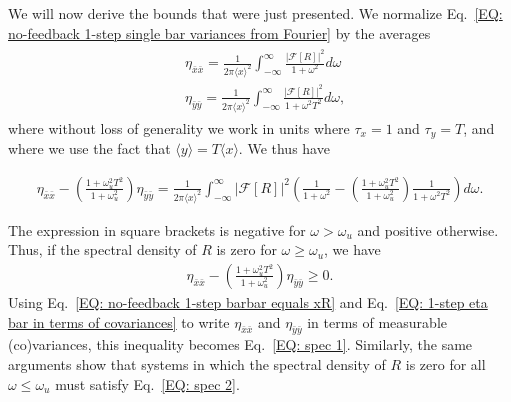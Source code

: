 \documentclass[%
 reprint,prx,
superscriptaddress,
%
%
%
%
%
%
%
%
%
 amsmath,amssymb,
 aps,
%
%
%
%
%
%
]{revtex4-2}
\begin{document}
We will now derive the bounds that were just presented.
We normalize Eq.~\eqref{EQ: no-feedback 1-step single bar variances from Fourier} by the averages 
\begin{align}
\begin{split}
 &\eta_{\bar{x}\bar{x}} = \frac{1}{2\pi\langle x \rangle^{2}}\int_{-\infty}^{\infty}\frac{|\mathcal{F}[R]|^{2}}{1+\omega^{2}}d\omega \\
 &\eta_{\bar{y}\bar{y}} = \frac{1}{2\pi \langle x \rangle^{2}}\int_{-\infty}^{\infty}\frac{|\mathcal{F}[R]|^{2}}{1+\omega^{2}T^{2}}d\omega ,
\end{split}
\end{align}
where without loss of generality we work in units where $\tau_{x} = 1$ and $\tau_{y} = T$, and where we use the fact that $\langle y \rangle = T \langle x \rangle$. We thus have 
\begin{widetext}
\begin{align*}
 \eta_{\bar{x}\bar{x}} - \left(\frac{1 + \omega_{u}^{2}T^{2}}{1 + \omega_{u}^{2}}\right) \eta_{\bar{y}\bar{y}} =  
 \frac{1}{2\pi\langle x \rangle^{2}}\int_{-\infty}^{\infty}|\mathcal{F}[R]|^{2}\left(\frac{1}{1+\omega^{2}} -  \left(\frac{1 + \omega_{u}^{2}T^{2}}{1 + \omega_{u}^{2}}\right) \frac{1}{1 + \omega^{2}T^{2}} \right) d\omega .
\end{align*}
\end{widetext}
The expression in square brackets is negative for $\omega > \omega_{u}$ and positive otherwise. Thus, if the spectral density of $R$ is zero for $\omega \geq \omega_{u}$, we have 
\begin{align*}
  \eta_{\bar{x}\bar{x}} - \left(\frac{1 + \omega_{u}^{2}T^{2}}{1 + \omega_{u}^{2}}\right) \eta_{\bar{y}\bar{y}} \geq 0 .
\end{align*}
Using Eq.~\eqref{EQ: no-feedback 1-step barbar equals xR} and Eq.~\eqref{EQ: 1-step eta bar in terms of covariances} to write $\eta_{\bar{x}\bar{x}}$ and $\eta_{\bar{y}\bar{y}}$ in terms of measurable (co)variances, this inequality becomes Eq.~\eqref{EQ: spec 1}. Similarly, the same arguments show that systems in which the spectral density of $R$ is zero for all $\omega \leq \omega_{u}$ must satisfy Eq.~\eqref{EQ: spec 2}.
\end{document}

